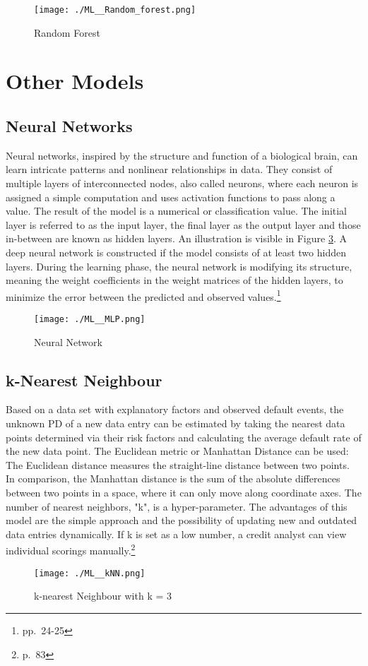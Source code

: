 \begin{figure}[H]
	\centering
	\texttt{[image: ./ML\_\_Random\_forest.png]}
    \caption{Random Forest}
    \label{fig:ml_ranforest}
\end{figure}

\section{Other Models}

\subsection{Neural Networks}
Neural networks, inspired by the structure and function of a biological brain, can learn intricate patterns and nonlinear relationships in data. They consist of multiple layers of interconnected nodes, also called neurons, where each neuron is assigned a simple computation and uses activation functions to pass along a value. The result of the model is a numerical or classification value. The initial layer is referred to as the input layer, the final layer as the output layer and those in-between are known as hidden layers. An illustration is visible in Figure \ref{fig:ml_neurnet}. A deep neural network is constructed if the model consists of at least two hidden layers. During the learning phase, the neural network is modifying its structure, meaning the weight coefficients in the weight matrices of the hidden layers, to minimize the error between the predicted and observed values.\footnote{\cite{locatelli:2022} pp.~24-25}

\begin{figure}[H]
	\centering
	\texttt{[image: ./ML\_\_MLP.png]}
    \caption{Neural Network}
    \label{fig:ml_neurnet}
\end{figure}

\subsection{k-Nearest Neighbour}
\label{sec:kNN}
Based on a data set with explanatory factors and observed default events, the unknown PD of a new data entry can be estimated by taking the nearest data points determined via their risk factors and calculating the average default rate of the new data point. The Euclidean metric or Manhattan Distance can be used: The Euclidean distance measures the straight-line distance between two points. In comparison, the Manhattan distance is the sum of the absolute differences between two points in a space, where it can only move along coordinate axes. The number of nearest neighbors, "k", is a hyper-parameter. The advantages of this model are the simple approach and the possibility of updating new and outdated data entries dynamically. If k is set as a low number, a credit analyst can view individual scorings manually.\footnote{\cite{Witzany:2017} p.~83}

\begin{figure}[H]
	\centering
	\texttt{[image: ./ML\_\_kNN.png]}
    \caption{k-nearest Neighbour with k = 3}
    \label{fig:ml_neurnet}
\end{figure}